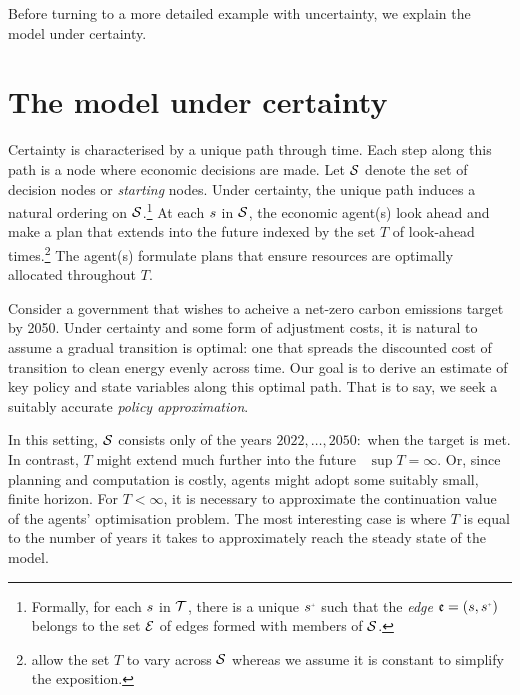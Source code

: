 \documentclass[12pt,a4paper,twoside, draft]{article}
\begin{document}
Before turning to a more detailed example with uncertainty, we explain the
model under certainty.
\section{The model under certainty}\label{sec-certainty}
Certainty is characterised by a unique path through time.
Each step along this path is a node where economic decisions are made.
Let $\mathcal{S}$ denote the set of decision nodes or \emph{starting} nodes.
Under certainty, the unique path induces a natural ordering on
$\mathcal{S}$.\footnote{
  Formally, for each ${s}$ in $\mathcal T$, there is a unique
  $\node^{\mplus}$ such that the \emph{edge} $\edge = (\node, \node^{\mplus})$
  belongs to the set $\mathcal{E}$ of edges formed with members of $\mathcal{S}$.
}
At each ${s}$ in $\mathcal{S}$, the economic agent(s) look ahead and make a plan
that extends into the future indexed by the set $T$ of look-ahead
times.\footnote{\citet{CJ} allow the set $T$ to vary across $\mathcal{S}$ whereas we
assume it is constant to simplify the exposition.}
The agent(s) formulate plans that ensure resources are optimally allocated
throughout $T$.

\begin{example}
  Consider a government that wishes to acheive a net-zero carbon emissions
  target by 2050.
  Under certainty and some form of adjustment costs, it is natural to
  assume a gradual transition is optimal: one that spreads the discounted cost
  of transition to clean energy evenly across time.
  Our goal is to derive an estimate of key policy and state variables along
  this optimal path.
  That is to say, we seek a suitably accurate \emph{policy approximation}.
  
  In this setting, $\mathcal{S}$ consists only of the years  $2022, \dots, 2050 :$
  when the target is met.
  In contrast, $T$ might extend much further into the future \eg\
  $\sup T = \infty$.
  Or, since planning and computation is costly, agents might adopt some
  suitably small, finite horizon.
  For $T < \infty$, it is necessary to approximate the continuation value of
  the agents' optimisation problem.
  The most interesting case is where $T$ is equal to the number of years it
  takes to approximately reach the steady state of the model.
\end{example}
\end{document}
